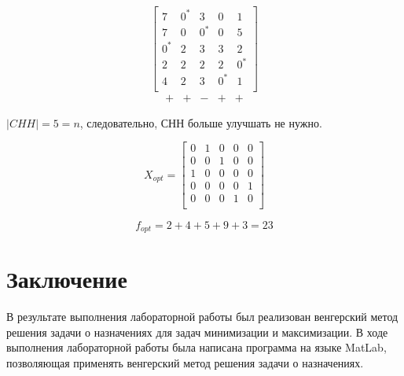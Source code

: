 \documentclass[a4paper,14pt]{article}
\begin{document}
\begin{equation}
\begin{bmatrix}
     7    &   0^*  &   3    &   0    &   1\\
     7    &   0    &   0^*  &   0    &   5\\
     0^*  &   2    &   3    &   3    &   2\\
     2    &   2    &   2    &   2    &   0^*\\
     4    &   2    &   3    &   0^*  &   1\\
\end{bmatrix}
\end{equation}
\begin{equation}
\begin{matrix}
+ & + & - & + & +
\end{matrix}
\end{equation}

$|CHH| = 5 = n$, следовательно, СНН больше улучшать не нужно. 

\begin{equation} X_{opt} = 
\begin{bmatrix}
     0  &   1  &   0  &   0  &   0\\
     0  &   0  &   1  &   0  &   0\\
     1  &   0  &   0  &   0  &   0\\
     0  &   0  &   0  &   0  &   1\\
     0  &   0  &   0  &   1  &   0\\
\end{bmatrix}
\end{equation}

\begin{equation}
f_{opt} = 2+4+5+9+3 = 23
\end{equation}


\section{Заключение}

В результате выполнения лабораторной работы был реализован венгерский метод решения задачи о назначениях для задач минимизации и максимизации. В ходе выполнения лабораторной работы была написана программа на языке MatLab, позволяющая применять венгерский метод решения задачи о назначениях.
\end{document}
